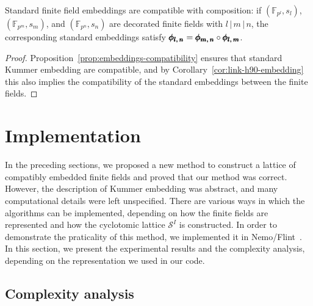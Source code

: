 \begin{prop}
\label{prop:ff-embeddings-compatibility}
Standard finite field embeddings are compatible with composition:
if $(\mathbb{F}_{p^l},s_l)$, $(\mathbb{F}_{p^m},s_m)$, and
$(\mathbb{F}_{p^n},s_n)$ are decorated finite fields
with $l\,|\,m\,|\,n$, the corresponding standard embeddings
satisfy $\pmb{\phi_{{l},\,{n}}}=\pmb{\phi_{{m},\,{n}}}\circ\pmb{\phi_{{l},\,{m}}}$.
\end{prop}
\begin{proof}
Proposition~\ref{prop:embeddings-compatibility} ensures that standard Kummer
embedding are compatible, and by Corollary~\ref{cor:link-h90-embedding} this
also implies the compatibility of the standard embeddings between the finite
fields.
\end{proof}

\section{Implementation}
\label{sec:implementation-std-lattices}

In the preceding sections, we proposed a new method to construct a lattice of
compatibly embedded finite fields and proved that our method was correct.
However, the description of Kummer embedding was abstract, and many
computational details were left unspecified. There are various ways in which the
algorithms can be implemented, depending on how the finite fields are
represented and how the cyclotomic lattice $\mathcal S^I$ is constructed. In
order to demonstrate the praticality of this method, we implemented it in
Nemo/Flint~\cite{Nemo, Flint}. In this section, we present the experimental
results and the complexity analysis, depending on the representation we used in
our code.

\subsection{Complexity analysis}

